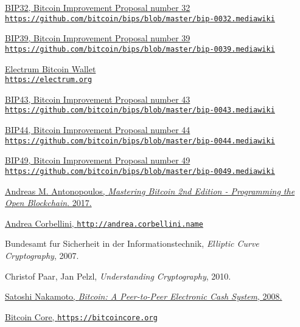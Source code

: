 \documentclass[
11pt, %
oneside, %
english, %
singlespacing, %
toctotoc, %
headsepline, %
]{MastersDoctoralThesis} %
\begin{document}
	\begin{thebibliography}{12}
		\href{https://github.com/bitcoin/bips/blob/master/bip-0032.mediawiki}{BIP32, Bitcoin Improvement Proposal number 32 \\ \texttt{https://github.com/bitcoin/bips/blob/master/bip-0032.mediawiki}}
		
		\href{https://github.com/bitcoin/bips/blob/master/bip-0039.mediawiki}{BIP39, Bitcoin Improvement Proposal number 39 \\ \texttt{https://github.com/bitcoin/bips/blob/master/bip-0039.mediawiki}}
		
		
		\href{https://electrum.org}{Electrum Bitcoin Wallet \\ \texttt{https://electrum.org}}
		
		\href{https://github.com/bitcoin/bips/blob/master/bip-0043.mediawiki}{BIP43, Bitcoin Improvement Proposal number 43 \\ \texttt{https://github.com/bitcoin/bips/blob/master/bip-0043.mediawiki}}

		\href{https://github.com/bitcoin/bips/blob/master/bip-0044.mediawiki}{BIP44, Bitcoin Improvement Proposal number 44 \\ \texttt{https://github.com/bitcoin/bips/blob/master/bip-0044.mediawiki}}
		
		\href{https://github.com/bitcoin/bips/blob/master/bip-0049.mediawiki}{BIP49, Bitcoin Improvement Proposal number 49 \\ \texttt{https://github.com/bitcoin/bips/blob/master/bip-0049.mediawiki}}
		
		\href{https://github.com/bitcoinbook/bitcoinbook}{Andreas M. Antonopoulos, \textit{Mastering Bitcoin 2nd Edition - Programming the Open Blockchain}. 2017.}
		
		\href{http://andrea.corbellini.name}{Andrea Corbellini, \texttt{http://andrea.corbellini.name}}
		
		Bundesamt fur Sicherheit in der Informationstechnik, \textit{Elliptic Curve Cryptography}, 2007.
		
		Christof Paar, Jan Pelzl, \textit{Understanding Cryptography}, 2010.
		
		\href{https://bitcoin.org/bitcoin.pdf}{Satoshi Nakamoto, \textit{Bitcoin: A Peer-to-Peer Electronic Cash System}, 2008.}
		
		\href{https://bitcoincore.org}{Bitcoin Core, \texttt{https://bitcoincore.org}}
		

	\end{thebibliography}

%
%
	
	\printbibliography[heading=bibintoc]
	
	
\end{document}
